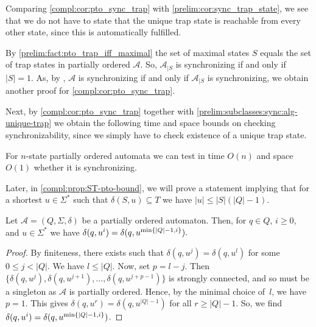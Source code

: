 Comparing \cref{compl:cor:pto_sync_trap} 
with \cref{prelim:cor:sync_trap_state},
we see that we do not have to state that the unique trap state
is reachable from every other state, since this is automatically fulfilled.

By \cref{prelim:fact:pto_trap_iff_maximal} the set of maximal states $S$
equals the set of trap states in partially ordered $\mathcal A$. So, $\mathcal A_{|S}$
is synchronizing if and only if $|S| = 1$.
As, by ,
$\mathcal A$ is synchronizing if and only if $\mathcal A_{|S}$
is synchronizing, we obtain another proof for \cref{compl:cor:pto_sync_trap}.

Next, by \cref{compl:cor:pto_sync_trap} together with \cref{prelim:subclasses:sync:alg-unique-trap}
we obtain the following time and space bounds on checking synchronizability,
since we simply have to check existence of a unique trap state.

\begin{proposition}
	For $n$-state partially ordered automata we can test
	in time $O(n)$ and space $O(1)$
	whether it is synchronizing.
\end{proposition}

Later, in \cref{compl:prop:ST-pto-bound}, we
will prove a statement implying that for a shortest $u \in \Sigma^*$
such that $\delta(S, u) \subseteq T$
we have $|u| \le |S| ( |Q| - 1 )$.

\begin{lemma} \label{prelim:classes:lem:pto}
	Let $\mathcal A = (Q, \Sigma,\delta)$ be a partially ordered automaton.
	Then, for $q \in Q$, $i \ge 0$,	and $u \in \Sigma^*$ we have
	$
	\delta(q,u^i) = \delta(q,u^{\min\{|Q|-1, i\}}).	
	$
\end{lemma}
\begin{proof}
	By finiteness, there exists 
	such that $\delta(q, u^j) = \delta(q, u^l)$
	for some $0 \le j < |Q|$. We have $l \le |Q|$. Now, set $p = l - j$.
	Then $\{ \delta(q, u^j), \delta(q, u^{j+1}), \ldots, \delta(q, u^{j+p-1}) \}$
	is strongly connected, and so must be a singleton
	as $\mathcal A$ is partially ordered. Hence, by the minimal choice of~$l$,
	we have $p = 1$. This gives
	$\delta(q, u^{r}) = \delta(q, u^{|Q|-1})$ for all $r \ge |Q| - 1$.
	So, we find $\delta(q,u^i) = \delta(q,u^{\min\{|Q|-1, i\}})$.
\end{proof}

